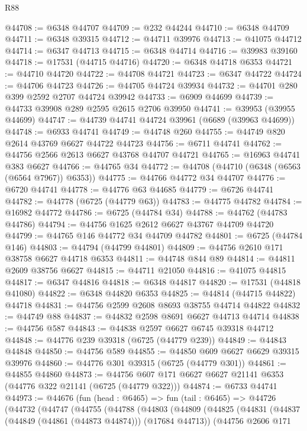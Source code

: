 \begin{lexlean}{R88}
\begin{coremodule}
@44708 := @6348 @44707
@44709 := @232 @44244
@44710 := @6348 @44709
@44711 := @6348 @39315
@44712 := @44711 @39976
@44713 := @41075 @44712
@44714 := @6347 @44713
@44715 := @6348 @44714
@44716 := @39983 @39160
@44718 := @17531 (@44715 @44716)
@44720 := @6348 @44718 @6353
@44721 := @44710 @44720
@44722 := @44708 @44721
@44723 := @6347 @44722
@44724 := @44706 @44723
@44726 := @44705 @44724 @39934
@44732 := @44701 @280 @399 @2592 @2707 @44724 @39942
@44733 := @6909 @44699
@44739 := @44733 @39908 @289 @2595 @2615 @2706 @39950
@44741 := @39953 (@39955 @44699)
@44747 := @44739 @44741 @44724 @39961 (@6689 (@39963 @44699))
@44748 := @6933 @44741
@44749 := @44748 @260
@44755 := @44749 @820 @2614 @43769 @6627 @44722 @44723
@44756 := @6711 @44741
@44762 := @44756 @2566 @2613 @6627 @43768 @44707 @44721
@44765 := @16963 @44741 @383 @6627
@44766 := @44765 @34
@44772 := @44708 (@44710 (@6348 (@6563 (@6564 @7967)) @6353))
@44775 := @44766 @44772 @34 @44707
@44776 := @6720 @44741
@44778 := @44776 @63 @44685
@44779 := @6726 @44741
@44782 := @44778 (@6725 (@44779 @63))
@44783 := @44775 @44782
@44784 := @16982 @44772
@44786 := @6725 (@44784 @34)
@44788 := @44762 (@44783 @44786)
@44794 := @44756 @1625 @2612 @6627 @43767 @44709 @44720
@44799 := @44765 @146 @44772 @34 @44709 @44782
@44801 := @6725 (@44784 @146)
@44803 := @44794 (@44799 @44801)
@44809 := @44756 @2610 @171 @38758 @6627 @44718 @6353
@44811 := @44748 @844 @89
@44814 := @44811 @2609 @38756 @6627
@44815 := @44711 @21050
@44816 := @41075 @44815
@44817 := @6347 @44816
@44818 := @6348 @44817
@44820 := @17531 (@44818 @41080)
@44822 := @6348 @44820 @6353
@44825 := @44814 (@44715 @44822) @44718
@44831 := @44756 @2599 @2608 @8693 @38755 @44714 @44822
@44832 := @44749 @88
@44837 := @44832 @2598 @8691 @6627 @44713 @44714
@44838 := @44756 @587
@44843 := @44838 @2597 @6627 @6745 @39318 @44712
@44848 := @44776 @239 @39318 (@6725 (@44779 @239))
@44849 := @44843 @44848
@44850 := @44756 @589
@44855 := @44850 @609 @6627 @6629 @39315 @39976
@44860 := @44776 @301 @39315 (@6725 (@44779 @301))
@44861 := @44855 @44860
@44873 := @44756 @607 @171 @6627 @6627 @21141 @6353 (@44776 @322 @21141 (@6725 (@44779 @322)))
@44874 := @6733 @44741
@44973 := @44676
    (fun (head : @6465) =>
    fun (tail : @6465) =>
    @44726
      (@44732
        (@44747
          (@44755
            (@44788
              (@44803
                (@44809
                  (@44825
                    (@44831
                      (@44837 (@44849 (@44861 (@44873 @44874))) (@17684 @44713))
                      (@44756
                        @2606
                        @171

\end{coremodule}
\end{lexlean}
